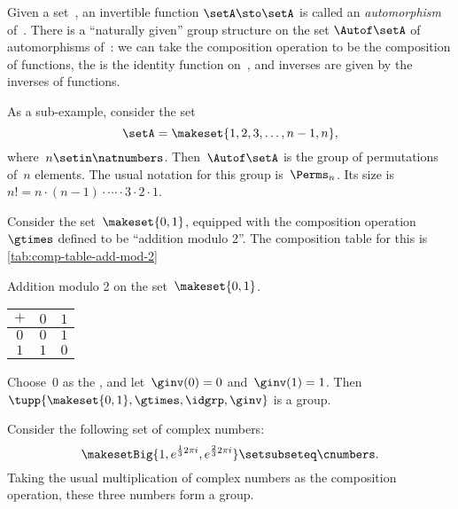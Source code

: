 \begin{example}
    Given a set~\setA, an invertible function $\setA \sto \setA$ is called an \emph{automorphism} of~\setA.
    There is a ``naturally given'' group structure on the set $\Autof\setA$ of automorphisms of~\setA:
    we can take the composition operation to be the composition of functions, the  is the identity function on~\setA, and inverses are given by the inverses of functions.

    As a sub-example, consider the set
    \begin{equation}
        \setA = \makeset{1, 2, 3, \dots, n-1, n},
    \end{equation}
    where~$n \setin \natnumbers$.
    Then~$\Autof\setA$ is the group of permutations of~$n$ elements.
    The usual notation for this group is~$\Perms_n$.
    Its size is~$n! = n \cdot (n-1) \cdot \cdots \cdot 3 \cdot 2 \cdot 1$.

\end{example}

\begin{example}
    \label{exa:grp-order-two}
    Consider the set~$\makeset{0, 1}$, equipped with the composition operation~$\gtimes$ defined to be ``addition modulo 2''.
    The composition table for this is \cref{tab:comp-table-add-mod-2}
    \begin{margintable}
        \caption{
            Addition modulo 2 on the set~$\makeset{0, 1}$.
        }
        \label{tab:comp-table-add-mod-2}
        \centering
        \begin{tabular}{c|cc}
            $+$ & $0$ & $1$ \\
            \hline
            $0$ & $0$ & $1$ \\
            $1$ & $1$ & $0$
        \end{tabular}
    \end{margintable}

    Choose~$0$ as the , and let~$\ginv(0) = 0$ and~$\ginv(1) = 1$.
    Then $\tupp{\makeset{0, 1}, \gtimes, \idgrp, \ginv}$ is a group.
\end{example}

\begin{example}
    \label{grp-order-three}
    Consider the following set of complex numbers:
    \begin{equation}
        \makesetBig{ 1, e^{\frac{1}{3}2\pi i}, e^{\frac{2 }{3}2\pi i} } \setsubseteq \cnumbers.
    \end{equation}
    Taking the usual multiplication of complex numbers as the composition operation, these three numbers form a group.
\end{example}

